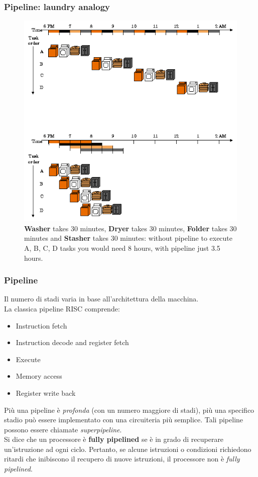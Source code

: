 \begin{frame}
	\frametitle{ Pipeline: laundry analogy}

				
		\begin{figure}[!htbp]
			\centering 
			\includegraphics[width=0.5\linewidth]{images/7_pipeline/laundry_analogy.png}
			\caption{\textbf{Washer} takes 30 minutes, \textbf{Dryer} takes 30 minutes, \textbf{Folder} takes 30 minutes and \textbf{Stasher} takes 30 minutes: without pipeline to execute A, B, C, D tasks you would need 8 hours, with pipeline just 3.5 hours.}
		\end{figure}

\end{frame}



\begin{frame}
	\frametitle{ Pipeline}

		Il numero di stadi varia in base all'architettura della macchina.\\
		La classica pipeline RISC comprende:
		\begin{itemize}
			\item Instruction fetch
			\item Instruction decode and register fetch
			\item Execute
			\item Memory access
			\item Register write back
		\end{itemize}
		
		Più una pipeline è \textit{profonda} (con un numero maggiore di stadi), più una specifico stadio può essere implementato con una circuiteria più semplice. Tali pipeline possono essere chiamate \textit{superpipeline}.\\
		Si dice che un processore è \textbf{fully pipelined} se è in grado di recuperare un'istruzione ad ogni ciclo. Pertanto, se alcune istruzioni o condizioni richiedono ritardi che inibiscono il recupero di nuove istruzioni, il processore non è \textit{fully pipelined}.

\end{frame}


